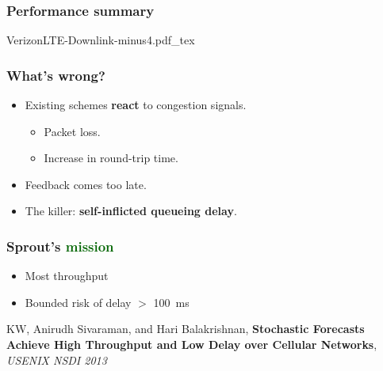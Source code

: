 \documentclass[svgnames]{beamer}
\begin{document}
\begin{frame}
\frametitle{Performance summary}

{
\def\svgwidth{\columnwidth}\footnotesize{VerizonLTE-Downlink-minus4.pdf_tex}
}
\end{frame}

\begin{frame}
\frametitle{What's wrong?}

\begin{itemize}
\item Existing schemes \textbf{react} to congestion signals.

\begin{itemize}
\item Packet loss.
\item Increase in round-trip time.
\end{itemize}

\item Feedback comes too late.

\item The killer: \textbf{self-inflicted queueing delay}.

\end{itemize}

\end{frame}

\begin{frame}
\frametitle{Sprout's \textcolor{DarkGreen}{\bf mission}}

\Large

\begin{itemize}
\item Most throughput
\item Bounded risk of delay $>$ 100~ms
\end{itemize}

\vspace{\baselineskip}
\vspace{\baselineskip}
\vspace{\baselineskip}

\scriptsize

KW, Anirudh Sivaraman, and Hari Balakrishnan, \textbf{Stochastic Forecasts Achieve High Throughput and Low Delay over Cellular Networks}, \textit{USENIX NSDI 2013}

\end{frame}
\end{document}
